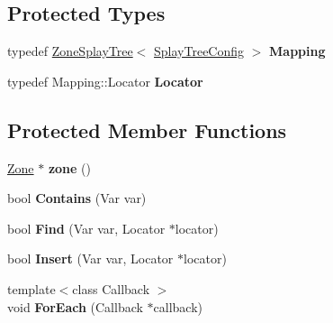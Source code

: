 \subsection*{Protected Types}
\begin{DoxyCompactItemize}
\item 
\hypertarget{classv8_1_1internal_1_1_effects_base_a9d50f78598972d7746c825a0699079d8}{}typedef \hyperlink{classv8_1_1internal_1_1_zone_splay_tree}{Zone\+Splay\+Tree}$<$ \hyperlink{structv8_1_1internal_1_1_effects_base_1_1_splay_tree_config}{Splay\+Tree\+Config} $>$ {\bfseries Mapping}\label{classv8_1_1internal_1_1_effects_base_a9d50f78598972d7746c825a0699079d8}

\item 
\hypertarget{classv8_1_1internal_1_1_effects_base_a2eec985884f11293e0b4c7612061713b}{}typedef Mapping\+::\+Locator {\bfseries Locator}\label{classv8_1_1internal_1_1_effects_base_a2eec985884f11293e0b4c7612061713b}

\end{DoxyCompactItemize}
\subsection*{Protected Member Functions}
\begin{DoxyCompactItemize}
\item 
\hypertarget{classv8_1_1internal_1_1_effects_base_a3f6f6d32a2b6b2ed41a1abe9cbf5e959}{}\hyperlink{classv8_1_1internal_1_1_zone}{Zone} $\ast$ {\bfseries zone} ()\label{classv8_1_1internal_1_1_effects_base_a3f6f6d32a2b6b2ed41a1abe9cbf5e959}

\item 
\hypertarget{classv8_1_1internal_1_1_effects_base_a092dba675cad8f4a054a35cf20e7d0da}{}bool {\bfseries Contains} (Var var)\label{classv8_1_1internal_1_1_effects_base_a092dba675cad8f4a054a35cf20e7d0da}

\item 
\hypertarget{classv8_1_1internal_1_1_effects_base_a11ee6a83a9148623f3426ea6f411ee31}{}bool {\bfseries Find} (Var var, Locator $\ast$locator)\label{classv8_1_1internal_1_1_effects_base_a11ee6a83a9148623f3426ea6f411ee31}

\item 
\hypertarget{classv8_1_1internal_1_1_effects_base_a1bf65f3f0fe10656820159faf058bc6d}{}bool {\bfseries Insert} (Var var, Locator $\ast$locator)\label{classv8_1_1internal_1_1_effects_base_a1bf65f3f0fe10656820159faf058bc6d}

\item 
\hypertarget{classv8_1_1internal_1_1_effects_base_ae01d9d6c0a2374be8ae05c05dc9450fe}{}{\footnotesize template$<$class Callback $>$ }\\void {\bfseries For\+Each} (Callback $\ast$callback)\label{classv8_1_1internal_1_1_effects_base_ae01d9d6c0a2374be8ae05c05dc9450fe}

\end{DoxyCompactItemize}
